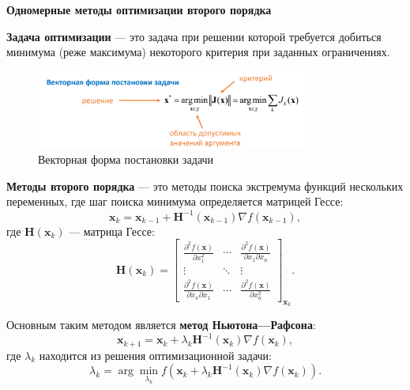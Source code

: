 \documentclass[a4paper,12pt]{article}
\begin{document}
\begin{center}
    \textbf{\Large Одномерные методы оптимизации второго порядка} \\[1cm] %
\end{center}

\textbf{Задача оптимизации} — это задача при решении которой требуется добиться минимума (реже максимума) некоторого критерия при заданных ограничениях. \cite{maslennicov}
\begin{figure}[h]  %
    \centering     %
    \includegraphics[width=0.8\textwidth]{task.png}  %
    \caption{Векторная форма постановки задачи}  %
    \label{fig:img-task}  %
\end{figure}

\textbf{Методы второго порядка} — это методы поиска экстремума функций нескольких переменных, где шаг поиска минимума определяется матрицей Гессе:
\begin{equation}
    \mathbf{x}_k = \mathbf{x}_{k-1} + \mathbf{H}^{-1}(\mathbf{x}_{k-1}) \nabla f(\mathbf{x}_{k-1}),
\end{equation}
где \( \mathbf{H}(\mathbf{x}_k) \) — матрица Гессе:
\[
    \mathbf{H}(\mathbf{x}_k) = 
    \begin{bmatrix}
        \frac{\partial^2 f(\mathbf{x})}{\partial x_1^2} & \cdots & \frac{\partial^2 f(\mathbf{x})}{\partial x_1 \partial x_n} \\
        \vdots & \ddots & \vdots \\
        \frac{\partial^2 f(\mathbf{x})}{\partial x_n \partial x_1} & \cdots & \frac{\partial^2 f(\mathbf{x})}{\partial x_n^2}
    \end{bmatrix}_{\mathbf{x}_k}.
\]

\vspace{0.3cm}

Основным таким методом является \textbf{метод Ньютона—Рафсона}:
\begin{equation}
    \mathbf{x}_{k+1} = \mathbf{x}_k + \lambda_k \mathbf{H}^{-1}(\mathbf{x}_k) \nabla f(\mathbf{x}_k),
\end{equation}
где \( \lambda_k \) находится из решения оптимизационной задачи:
\begin{equation}
    \lambda_k = \arg \min_{\lambda_k} f\left( \mathbf{x}_k + \lambda_k \mathbf{H}^{-1}(\mathbf{x}_k) \nabla f(\mathbf{x}_k) \right).
\end{equation}
\end{document}
